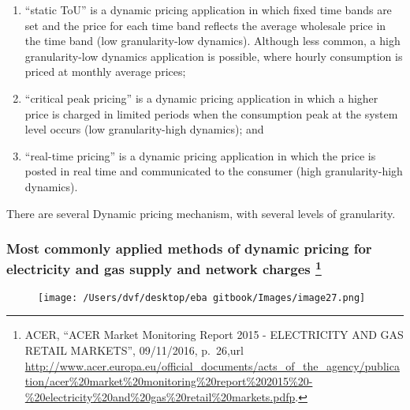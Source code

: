 \documentclass[]{book}
\let\rmarkdownfootnote\footnote%
\def\footnote{\protect\rmarkdownfootnote}
\theoremstyle{definition}
\theoremstyle{definition}
\theoremstyle{definition}
\theoremstyle{remark}
\begin{document}
\begin{enumerate}
\def\labelenumi{\alph{enumi})}
\item
  ``static ToU'' is a dynamic pricing application in which fixed time
  bands are set and the price for each time band reflects the average
  wholesale price in the time band (low granularity-low dynamics).
  Although less common, a high granularity-low dynamics application is
  possible, where hourly consumption is priced at monthly average
  prices;
\item
  ``critical peak pricing'' is a dynamic pricing application in which a
  higher price is charged in limited periods when the consumption peak
  at the system level occurs (low granularity-high dynamics); and
\item
  ``real-time pricing'' is a dynamic pricing application in which the
  price is posted in real time and communicated to the consumer (high
  granularity-high dynamics).
\end{enumerate}

There are several Dynamic pricing mechanism, with several levels of
granularity.

\subsubsection[Most commonly applied methods of dynamic pricing for
electricity and gas supply and network charges ]{\texorpdfstring{Most
commonly applied methods of dynamic pricing for electricity and gas
supply and network charges \footnote{ACER, ``ACER Market Monitoring
  Report 2015 - ELECTRICITY AND GAS RETAIL MARKETS'', 09/11/2016,
  p.~26,url
  \url{http://www.acer.europa.eu/official_documents/acts_of_the_agency/publication/acer\%20market\%20monitoring\%20report\%202015\%20-\%20electricity\%20and\%20gas\%20retail\%20markets.pdfp}.}}{Most commonly applied methods of dynamic pricing for electricity and gas supply and network charges }}\label{most-commonly-applied-methods-of-dynamic-pricing-for-electricity-and-gas-supply-and-network-charges-13}

\begin{figure}[htbp]
\centering
\texttt{[image: /Users/dvf/desktop/eba gitbook/Images/image27.png]}
\caption{}
\end{figure}
\end{document}
